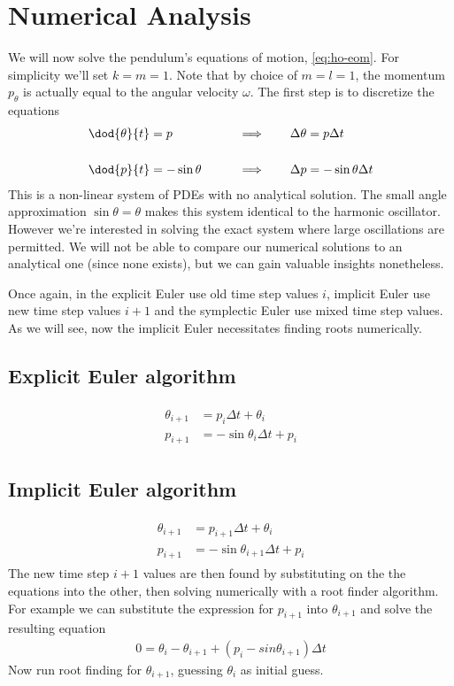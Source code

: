 \section{Numerical Analysis}
We will now solve the pendulum's equations of motion, \eqref{eq:ho-eom}. For simplicity we'll set $k = m = 1$. Note that by choice of $m=l=1$, the momentum $p_\theta$ is actually equal to the angular velocity $\omega$. The first step is to discretize the equations
\begin{alignat}{2}
&\dod{\theta}{t} = p  & \qquad \implies \qquad &\Delta \theta = p \Delta t \\[0.5cm]
&\dod{p}{t} = -\sin{\theta} & \qquad \implies \qquad &\Delta p = - \sin{\theta} \Delta t
\end{alignat}
This is a non-linear system of PDEs with no analytical solution. The small angle approximation $\sin{\theta} = \theta$ makes this system identical to the harmonic oscillator. However we're interested in solving the exact system where large oscillations are permitted. We will not be able to compare our numerical solutions to an analytical one (since none exists), but we can gain valuable insights nonetheless.

Once again, in the explicit Euler use old time step values $i$, implicit Euler use new time step values $i+1$ and the symplectic Euler use mixed time step values. As we will see, now the implicit Euler necessitates finding roots numerically.
\subsection{Explicit Euler algorithm}
\begin{align}
\begin{split}
\label{al:pe-euler_e}
\theta_{i+1} &= p_i \Delta t + \theta_i \\
p_{i+1} &= - \sin{\theta_i} \Delta t + p_i
\end{split}
\end{align}

\subsection{Implicit Euler algorithm}
\begin{align}
\begin{split}
\label{al:pe-euler_i}
\theta_{i+1} &= p_{i+1} \Delta t + \theta_i \\
p_{i+1} &= - \sin{\theta_{i+1}} \Delta t + p_i
\end{split}
\end{align}
The new time step $i+1$ values are then found by substituting on the the equations into the other, then solving numerically with a root finder algorithm. For example we can substitute the expression for $p_{i+1}$ into $\theta_{i+1}$ and solve the resulting equation
\begin{align}
0 = \theta_i - \theta_{i+1} + (p_i - sin{\theta_{i+1}})\Delta t
\end{align}
Now run root finding for $\theta_{i+1}$, guessing $\theta_i$ as initial guess.

